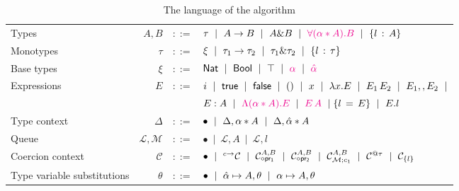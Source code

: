 \documentclass{article}
\begin{document}
\begin{table}[h]
  \begin{tabular}{l r r l}
    Types         & $A, B$   & $::=$ & $\tau~\mid~A \to B~\mid~A \& B~\mid~\textcolor{magenta}{\Tabs{\alpha}{A}{B}}~\mid~\trecord{l}{A}$\vspace{0.1cm}\\
    Monotypes     & $\tau$   & $::=$ & $\xi~\mid~\tau_1\to\tau_2~\mid~\tau_1\&\tau_2~\mid~\trecord{l}{\tau}$ \vspace{0.1cm}\\
    Base types    & $\xi$    & $::=$ & $\nat~\mid~\bool~\mid~\top~\mid~\textcolor{magenta}{\alpha}~\mid~\textcolor{magenta}{\hat{\alpha}}$ \vspace{0.3cm}\\
    Expressions   & $E$      & $::=$ & $i~\mid~\True~\mid~\False~\mid~()~\mid~x~\mid~\abs{x}{E}~\mid~E_1\,E_2~\mid~E_1,,E_2~\mid$\vspace{0.1cm}\\
                  &          &       & $E : A~\mid~\textcolor{magenta}{\tabs{\alpha}{A}{E}}~\mid~\textcolor{magenta}{E\,A}~\mid\record{l}{E}~\mid~E.l$\vspace{0.3cm}\\
    Type context  & $\Delta$ & $::=$ & $\bullet~\mid~\Delta,\tentry{\alpha}{A}~\mid~\Delta,\tentry{\hat{\alpha}}{A}$\vspace{0.3cm}\\
    Queue         & $\mathcal{L},\mathcal{M}$ & $::=$ & $\bullet~\mid~\mathcal{L},A~\mid~\mathcal{L},l$\vspace{0.3cm}\\
    Coercion context & $\mathcal{C}$ & $::=$ & $\bullet~\mid~\arrCC{\mathcal{C}}{c}~\mid~\projlCC{\mathcal{C}}{A}{B}~\mid~\projrCC{\mathcal{C}}{A}{B}~\mid~\mpCC{\mathcal{C}}{\mathcal{M}}{c_1}{A}{B}~\mid~\alllCC{\mathcal{C}}{\tau}~\mid~\recCC{\mathcal{C}}{l}$\vspace{0.3cm}\\
    Type variable substitutions & $\theta$ & $::=$ & $\bullet~\mid~\unification{\alpha}{A},\theta~\mid~\substitution{\alpha}{A},\theta$\vspace{0.3cm}
  \end{tabular}
  \caption{The language of the algorithm}
\end{table}
\end{document}
